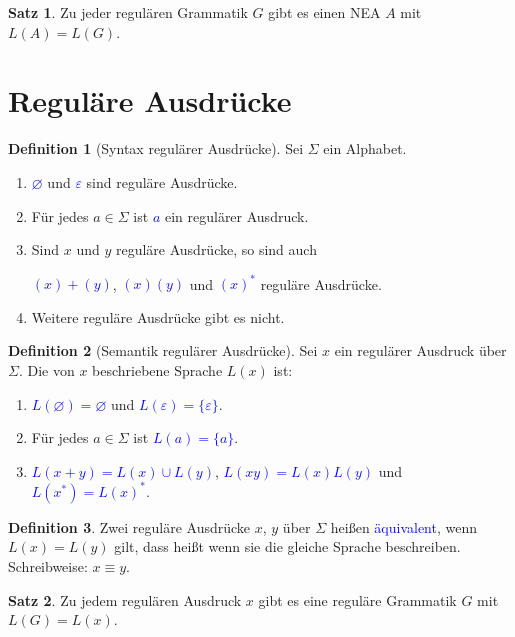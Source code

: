 \documentclass{scrreprt}
\theoremstyle{definition}
\newtheorem{Definition}{Definition}[section]
\newtheorem{Satz}{Satz}[section]
\theoremstyle{example}
\theoremstyle{algorithm}
\begin{document}
\begin{Satz}
Zu jeder regulären Grammatik $G$ gibt es einen NEA $A$ mit ${L(A)=L(G)}$.
\end{Satz}

\section{Reguläre Ausdrücke}

\begin{Definition}[Syntax regulärer Ausdrücke]
Sei $\Sigma$ ein Alphabet.
\begin{enumerate}
\item
\textcolor{blue}{$\varnothing$} und \textcolor{blue}{$\varepsilon$} sind reguläre Ausdrücke.
\item
Für jedes $a\in \Sigma$ ist \textcolor{blue}{$a$} ein regulärer Ausdruck.
\item
Sind $x$ und $y$ reguläre Ausdrücke, so sind auch\par
\textcolor{blue}{$(x)+(y)$}, \textcolor{blue}{$(x)(y)$} und \textcolor{blue}{$(x)^*$} reguläre Ausdrücke.
\item
Weitere reguläre Ausdrücke gibt es nicht.
\end{enumerate}
\end{Definition}

\begin{Definition}[Semantik regulärer Ausdrücke]
Sei $x$ ein regulärer Ausdruck über $\Sigma$. Die von $x$ beschriebene Sprache $L(x)$ ist:
\begin{enumerate}
\item
\textcolor{blue}{$L(\varnothing) = \varnothing$} und \textcolor{blue}{$L(\varepsilon) = \{\varepsilon\}$}.
\item
Für jedes $a\in\Sigma$ ist \textcolor{blue}{$L(a) = \{a\}$}.
\item
\textcolor{blue}{$L(x+y)=L(x)\cup L(y)$}, \textcolor{blue}{$L(xy)=L(x)L(y)$} und \textcolor{blue}{$L(x^*)=L(x)^*$}.
\end{enumerate}
\end{Definition}

\begin{Definition}
Zwei reguläre Ausdrücke $x$, $y$ über $\Sigma$ heißen \textcolor{blue}{äquivalent}, wenn ${L(x)=L(y)}$ gilt, dass heißt wenn sie die gleiche Sprache beschreiben. Schreibweise: ${x \equiv y}$.
\end{Definition}

\begin{Satz}
Zu jedem regulären Ausdruck $x$ gibt es eine reguläre Grammatik $G$ mit ${L(G)=L(x)}$. 
\end{Satz}
\end{document}
